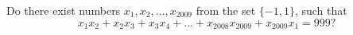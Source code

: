 \documentclass[varwidth]{standalone}
\begin{document}
    Do there exist numbers $x_1, x_2, \dots, x_{2009}$ from the set $\{-1, 1\}$, such that
    \[
        x_1 x_2 + x_2 x_3 + x_3 x_4 + \dots + x_{2008} x_{2009} + x_{2009} x_1 = 999?  
    \]
\end{document}
